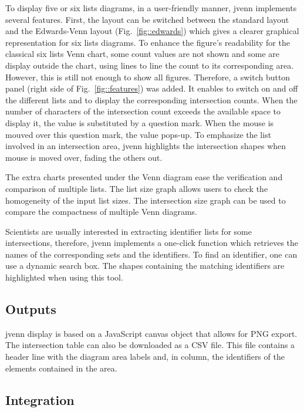 \documentclass{bmcart}
\begin{document}
To display five or six lists diagrams, in a user-friendly manner, jvenn
implements several features.
First, the layout can be switched between the standard layout and the
Edwards-Venn layout (Fig.~\ref{fig::edwards}) which gives a clearer graphical
representation for six lists diagrams. To enhance the figure's readability for
the classical six lists Venn chart, some count values are not shown and some are
display outside the chart, using lines to line the count to its corresponding
area. However, this is still not enough to show all figures. Therefore, a switch
button panel (right side of Fig.~\ref{fig::features}) was added. It enables to
switch on and off the different lists and to display the corresponding 
intersection counts. 
When the number of characters of the intersection count exceeds the available
space to display it, the value is substituted by a question mark. When the mouse
is mouved over this question mark, the value pops-up. To emphasize the list
involved in an intersection area, jvenn highlights the intersection shapes when
mouse is moved over, fading the others out.

The extra charts presented under the Venn diagram ease the verification and
comparison of multiple lists. The list size graph allows users to check the
homogeneity of the input list sizes. The intersection size graph can be used to
compare the compactness of multiple Venn diagrams.

Scientists are usually interested in extracting identifier lists for some
intersections, therefore, jvenn implements a one-click function which retrieves
the names of the corresponding sets and the identifiers. To find an identifier,
one can use a dynamic search box. The shapes containing the matching 
identifiers are highlighted when using this tool.

\subsection*{Outputs}

jvenn display is based on a JavaScript canvas object that allows for PNG 
export. The intersection table can also be downloaded as a CSV file. This file
contains a header line with the diagram area labels and, in column, the
identifiers of the elements contained in the area.

\subsection*{Integration}
\end{document}
